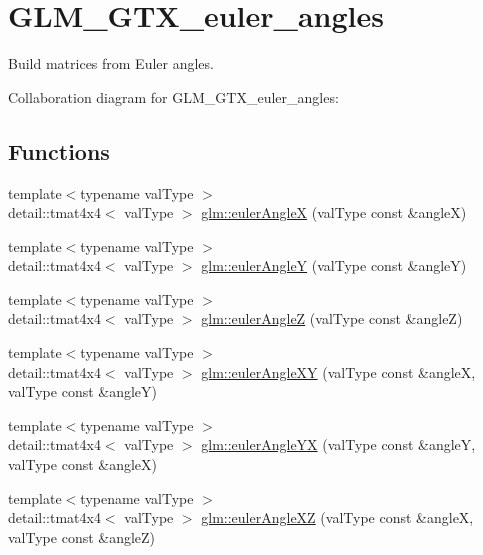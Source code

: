 \hypertarget{group__gtx__euler__angles}{}\section{G\+L\+M\+\_\+\+G\+T\+X\+\_\+euler\+\_\+angles}
\label{group__gtx__euler__angles}


Build matrices from Euler angles.  


Collaboration diagram for G\+L\+M\+\_\+\+G\+T\+X\+\_\+euler\+\_\+angles\+:
\subsection*{Functions}
\begin{DoxyCompactItemize}
\item 
{\footnotesize template$<$typename val\+Type $>$ }\\detail\+::tmat4x4$<$ val\+Type $>$ \hyperlink{group__gtx__euler__angles_gaac45eaecc2f40ecdda03a7112693dabf}{glm\+::euler\+Angle\+X} (val\+Type const \&angle\+X)
\item 
{\footnotesize template$<$typename val\+Type $>$ }\\detail\+::tmat4x4$<$ val\+Type $>$ \hyperlink{group__gtx__euler__angles_gae31b378f18fb01ed6d44c3f92f76eba5}{glm\+::euler\+Angle\+Y} (val\+Type const \&angle\+Y)
\item 
{\footnotesize template$<$typename val\+Type $>$ }\\detail\+::tmat4x4$<$ val\+Type $>$ \hyperlink{group__gtx__euler__angles_gaa309eabf292cab65cde623f398910685}{glm\+::euler\+Angle\+Z} (val\+Type const \&angle\+Z)
\item 
{\footnotesize template$<$typename val\+Type $>$ }\\detail\+::tmat4x4$<$ val\+Type $>$ \hyperlink{group__gtx__euler__angles_ga943a94f69965d594efde254c139aaae8}{glm\+::euler\+Angle\+X\+Y} (val\+Type const \&angle\+X, val\+Type const \&angle\+Y)
\item 
{\footnotesize template$<$typename val\+Type $>$ }\\detail\+::tmat4x4$<$ val\+Type $>$ \hyperlink{group__gtx__euler__angles_gaac8d93a4b3ae4014ff8f1c5a5a793236}{glm\+::euler\+Angle\+Y\+X} (val\+Type const \&angle\+Y, val\+Type const \&angle\+X)
\item 
{\footnotesize template$<$typename val\+Type $>$ }\\detail\+::tmat4x4$<$ val\+Type $>$ \hyperlink{group__gtx__euler__angles_gafc6f582fa044bcece3506ffd6d31ef59}{glm\+::euler\+Angle\+X\+Z} (val\+Type const \&angle\+X, val\+Type const \&angle\+Z)

\end{DoxyCompactItemize}
